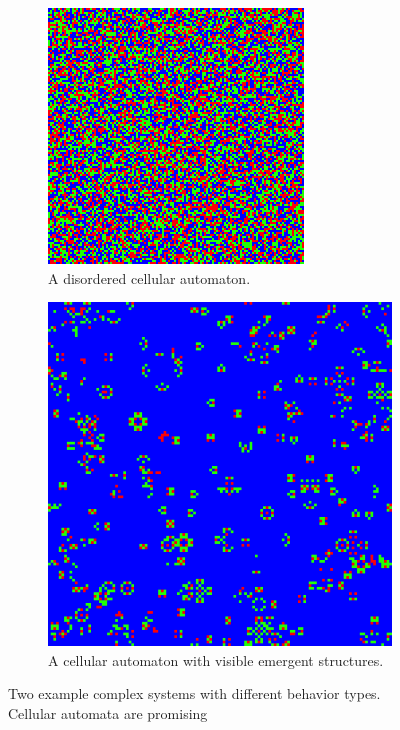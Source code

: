 \begin{figure}[htbp]
  \centering
\begin{subfigure}[b]{.4\linewidth}
  \centering
  \includegraphics[width=\linewidth]{figures/disord2.png}
  \caption{A disordered cellular automaton.}
 \label{fig:disordered_sys}
\end{subfigure}
\hspace{30pt}
\begin{subfigure}[b]{.4\linewidth}
  \centering
  \includegraphics[width=\linewidth]{figures/micro4.png}
  \caption{A cellular automaton with visible emergent structures.}
  \label{fig:structured_sys}
\end{subfigure}
  \caption{Two example complex systems with different behavior types. Cellular
    automata are promising }
  \label{fig:comparison_ca}
\end{figure}

